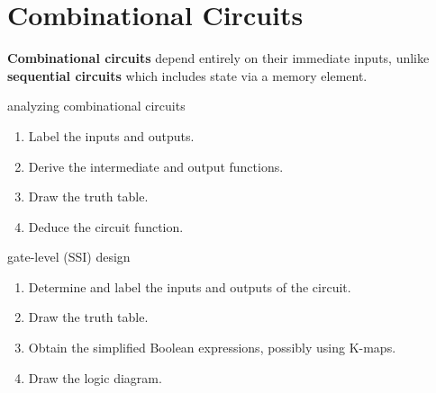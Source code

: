\section{Combinational Circuits}
\textbf{Combinational circuits} depend entirely on their immediate inputs,
unlike \textbf{sequential circuits} which includes state via a memory element.

\begin{defn*}{analyzing combinational circuits}
    \begin{enumerate}
        \item Label the inputs and outputs.
        \item Derive the intermediate and output functions.
        \item Draw the truth table.
        \item Deduce the circuit function.
    \end{enumerate}
\end{defn*}

\begin{defn*}{gate-level (SSI) design}
    \begin{enumerate}
        \item Determine and label the inputs and outputs of the circuit.
        \item Draw the truth table.
        \item Obtain the simplified Boolean expressions, possibly using K-maps.
        \item Draw the logic diagram.
    \end{enumerate}
\end{defn*}